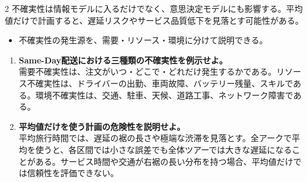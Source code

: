 \begin{multicols}{2}
不確実性は情報モデルに入るだけでなく、意思決定モデルにも影響する。平均値だけで計画すると、遅延リスクやサービス品質低下を見落とす可能性がある。\par
{}
\begin{itemize}
\item 不確実性の発生源を、需要・リソース・環境に分けて説明できる。
\end{itemize}
\begin{enumerate}
\item \textbf{Same-Day配送における三種類の不確実性を例示せよ。}\\需要不確実性は、注文がいつ・どこで・どれだけ発生するかである。リソース不確実性は、ドライバーの出勤、車両故障、バッテリー残量、スキルである。環境不確実性は、交通、駐車、天候、道路工事、ネットワーク障害である。
\item \textbf{平均値だけを使う計画の危険性を説明せよ。}\\平均旅行時間では、遅延の裾の長さや極端な渋滞を見落とす。全アークで平均を使うと、各区間では小さな誤差でも全体ツアーでは大きな遅延になることがある。サービス時間や交通が右裾の長い分布を持つ場合、平均値だけでは信頼性を評価できない。
\end{enumerate}
\end{multicols}


